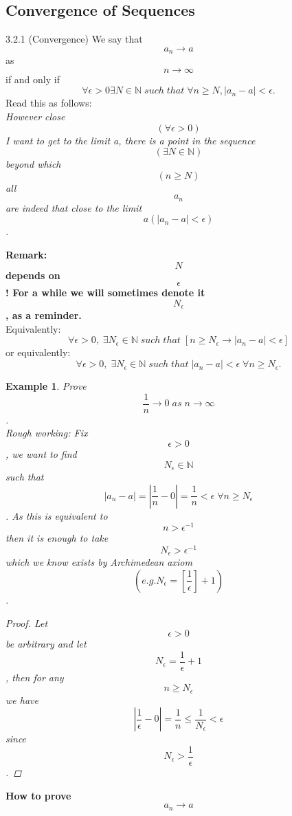 \documentclass[a4paper]{article}
\def\nn{{\mathbb N}}
\newtheorem{example}{Example}[subsection]
\begin{document}
\subsection{Convergence of Sequences}
\begin{definition}{3.2.1 (Convergence)}{}
    We say that $$a_n\rightarrow a$$ as $$n\rightarrow \infty$$ if and only if 
    \begin{equation*}
        \forall \epsilon >0 \exists N \in \nn \; such\; that\; \forall n \geq N, |a_n-a|<\epsilon . 
    \end{equation*}
    Read this as follows:\\
    \textit{However close $$(\forall \epsilon >0)$$ I want to get to the limit a, there is a point in the sequence $$(\exists N \in \nn)$$ beyond which $$(n\geq N)$$ all $$a_n$$ are indeed that close to the limit $$a(|a_n-a|<\epsilon)$$.}
\end{definition}
\textbf{Remark: $$N$$ depends on $$\epsilon$$ ! For a while we will sometimes denote it $$N_\epsilon$$, as a reminder.}\\
Equivalently:
\begin{equation*}
    \forall \epsilon>0,\; \exists N_\epsilon \in \nn \;such \;that\; [n\geq N_\epsilon \rightarrow |a_n-a|<\epsilon]
\end{equation*}
or equivalently:
\begin{equation*}
    \forall \epsilon >0,\; \exists N_\epsilon \in \nn \; such \; that\; |a_n-a|<\epsilon \; \forall n\geq N_\epsilon.
\end{equation*}
\begin{example}
    Prove $$\frac{1}{n}\rightarrow 0 \;as \; n\rightarrow \infty$$. \\
    \textit{Rough working:} Fix $$\epsilon>0$$, we want to find $$N_\epsilon \in \nn$$ such that $$|a_n-a|=|\frac{1}{n}-0|=\frac{1}{n}<\epsilon \; \forall n\geq N_\epsilon$$. As this is equivalent to $$n>\epsilon^{-1}$$ then it is enough to take $$N_\epsilon >\epsilon^{-1}$$ which we know exists by Archimedean axiom $$(e.g. N_\epsilon=[\frac{1}{\epsilon}]+1)$$. 
    \begin{proof}
        Let $$\epsilon>0$$ be arbitrary  and let $$N_\epsilon=\frac{1}{\epsilon}+1$$, then for any $$n\geq N_\epsilon$$ we have $$|\frac{1}{\epsilon}-0|=\frac{1}{n}\leq \frac{1}{N_\epsilon}<\epsilon$$ since $$N_\epsilon >\frac{1}{\epsilon}$$.
    \end{proof}
\end{example}
\textsf{\textbf{How to prove} $$a_n\rightarrow a$$}\\
\end{document}
